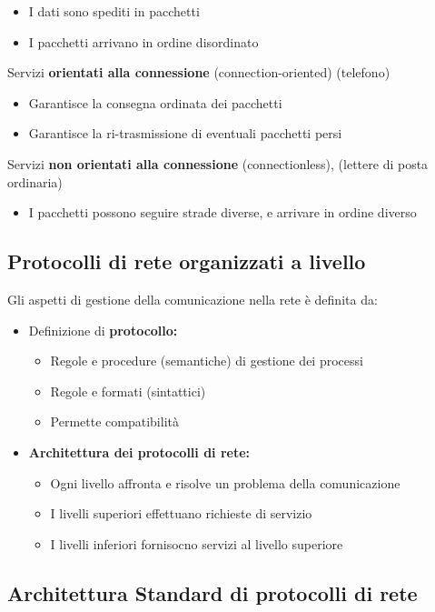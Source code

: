 \documentclass{article}
\begin{document}
\begin{itemize}
    \item I dati sono spediti in pacchetti
    \item I pacchetti arrivano in ordine disordinato
    \end{itemize}
     Servizi \textbf{orientati alla connessione} (connection-oriented) (telefono)
    \begin{itemize}
        \item Garantisce la consegna ordinata dei pacchetti
        \item Garantisce la ri-trasmissione di eventuali pacchetti persi
    \end{itemize}
    Servizi \textbf{non orientati alla connessione} (connectionless), (lettere di posta ordinaria)
    \begin{itemize}
        \item I pacchetti possono seguire strade diverse, e arrivare in ordine diverso
    \end{itemize}


\subsection{Protocolli di rete organizzati a livello}

Gli aspetti di gestione della comunicazione nella rete è definita da:
\begin{itemize}
    \item Definizione di \textbf{protocollo:}
    \begin{itemize}
        \item Regole e procedure (semantiche) di gestione dei processi
        \item Regole e formati (sintattici)
        \item Permette compatibilità
    \end{itemize}
    \item \textbf{Architettura dei protocolli di rete:}
    \begin{itemize}
        \item Ogni livello affronta e risolve un problema della comunicazione
        \item I livelli superiori effettuano richieste di servizio
        \item I livelli inferiori fornisocno servizi al livello superiore
    \end{itemize}
\end{itemize}

\subsection{Architettura Standard di protocolli di rete}
\end{document}
